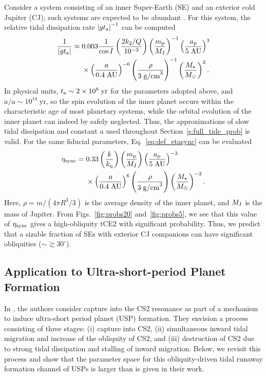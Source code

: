 \documentclass[
        fleqn,
        usenatbib,
    ]{mnras}
\newcommand*{\abs}[1]{\left|#1\right|}
\newcommand*{\p}[1]{\left(#1\right)}
\begin{document}
Consider a system consisting of an inner Super-Earth (SE) and an exterior cold
Jupiter (CJ); such systems are expected to be abundant \citep{zhu2018super}. For
this system, the relative tidal dissipation rate $\abs{gt_{\rm a}}^{-1}$ can be
computed
\begin{align}
    \frac{1}{\abs{g t_{\rm a}}}
        \approx{}& 0.003\frac{1}{\cos I}\p{\frac{2k_2/Q}{10^{-3}}}
            \p{\frac{m_{\rm p}}{M_{\rm J}}}^{-1}
            \p{\frac{a_{\rm p}}{5 \;\mathrm{AU}}}^{3}\nonumber\\
        &\times \p{\frac{a}{0.4\;\mathrm{AU}}}^{-6}
            \p{\frac{\rho}{3 \; \mathrm{g/cm}^3}}^{-1}
            \p{\frac{M_\star}{M_{\odot}}}^{2}.
\end{align}
In physical units, $t_{\rm a} \sim 2 \times 10^8\;\mathrm{yr}$ for the
parameters adopted above, and $\dot{a} / a \sim 10^{14}\;\mathrm{yr}$, so the
spin evolution of the inner planet occurs within the characteristic age of most
planetary systems, while the orbital evolution of the inner planet can indeed by
safely neglected. Thus, the approximations of slow tidal dissipation and
constant $a$ used throughout Section~\ref{s:full_tide_prob} is valid.
For the same fiducial parameters, Eq.~\eqref{eq:def_etasync} can be evaluated
\begin{align}
    \eta_{\rm sync} ={}& 0.33 \p{\frac{k}{k_{\rm q}}}
            \p{\frac{m_{\rm p}}{M_{\rm J}}}
            \p{\frac{a_{\rm p}}{5 \;\mathrm{AU}}}^{-3}\nonumber\\
        &\times \p{\frac{a}{0.4\;\mathrm{AU}}}^{6}
            \p{\frac{\rho}{3 \; \mathrm{g/cm}^3}}
            \p{\frac{M_\star}{M_{\odot}}}^{-2}.\label{eq:sehj_etasync}
\end{align}
Here, $\rho = m / \p{4\pi R^3/3}$ is the average density of the inner planet,
and $M_{\rm J}$ is the mass of Jupiter. From Figs.~\ref{fig:probs20}
and~\ref{fig:probs5}, we see that this value of $\eta_{\rm sync}$ gives a
high-obliquity tCE2 with significant probability. Thus, we predict that a
sizable fraction of SEs with exterior CJ companions can have significant
obliquities ($\sim \gtrsim 30^\circ$).

\subsection{Application to Ultra-short-period Planet Formation
}\label{ss:disc_usp}

In \citet{millholland2020formation}, the authors consider capture into the CS2
resonance as part of a mechanism to induce ultra-short period planet (USP)
formation. They envision a process consisting of three stages: (i) capture into
CS2, (ii) simultaneous inward tidal migration and increase of the obliquity of
CS2, and (iii) destruction of CS2 due to strong tidal dissipation and stalling
of inward migration. Below, we revisit this process and show that the parameter
space for this obliquity-driven tidal runaway formation channel of USPs is
larger than is given in their work.
\end{document}
